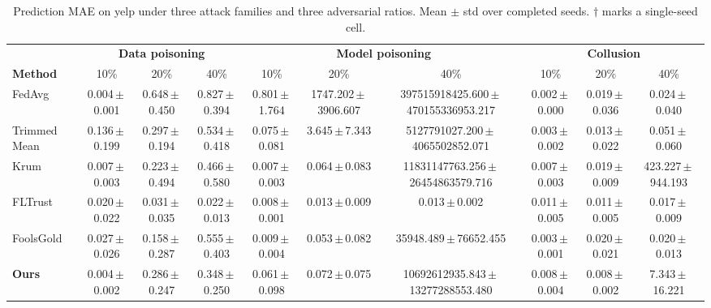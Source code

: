 \begin{table}[t]
\centering
\scriptsize
\caption{Prediction MAE on yelp under three attack families and three adversarial ratios. Mean $\pm$ std over completed seeds. $\dagger$ marks a single-seed cell.}
\label{tab:main_results}
\begin{tabular}{lccccccccc}
\toprule
& \multicolumn{3}{c}{\textbf{Data poisoning}}& \multicolumn{3}{c}{\textbf{Model poisoning}}& \multicolumn{3}{c}{\textbf{Collusion}} \\
\cmidrule(lr){2-4}\cmidrule(lr){5-7}\cmidrule(lr){8-10}
\textbf{Method} & 10\% & 20\% & 40\% & 10\% & 20\% & 40\% & 10\% & 20\% & 40\% \\
\midrule
FedAvg & 0.004\,$\pm$\,0.001 & 0.648\,$\pm$\,0.450 & 0.827\,$\pm$\,0.394 & 0.801\,$\pm$\,1.764 & 1747.202\,$\pm$\,3906.607 & 397515918425.600\,$\pm$\,470155336953.217 & 0.002\,$\pm$\,0.000 & 0.019\,$\pm$\,0.036 & 0.024\,$\pm$\,0.040 \\
Trimmed Mean & 0.136\,$\pm$\,0.199 & 0.297\,$\pm$\,0.194 & 0.534\,$\pm$\,0.418 & 0.075\,$\pm$\,0.081 & 3.645\,$\pm$\,7.343 & 5127791027.200\,$\pm$\,4065502852.071 & 0.003\,$\pm$\,0.002 & 0.013\,$\pm$\,0.022 & 0.051\,$\pm$\,0.060 \\
Krum & 0.007\,$\pm$\,0.003 & 0.223\,$\pm$\,0.494 & 0.466\,$\pm$\,0.580 & 0.007\,$\pm$\,0.003 & 0.064\,$\pm$\,0.083 & 11831147763.256\,$\pm$\,26454863579.716 & 0.007\,$\pm$\,0.003 & 0.019\,$\pm$\,0.009 & 423.227\,$\pm$\,944.193 \\
FLTrust & 0.020\,$\pm$\,0.022 & 0.031\,$\pm$\,0.035 & 0.022\,$\pm$\,0.013 & 0.008\,$\pm$\,0.001 & 0.013\,$\pm$\,0.009 & 0.013\,$\pm$\,0.002 & 0.011\,$\pm$\,0.005 & 0.011\,$\pm$\,0.005 & 0.017\,$\pm$\,0.009 \\
FoolsGold & 0.027\,$\pm$\,0.026 & 0.158\,$\pm$\,0.287 & 0.555\,$\pm$\,0.403 & 0.009\,$\pm$\,0.004 & 0.053\,$\pm$\,0.082 & 35948.489\,$\pm$\,76652.455 & 0.003\,$\pm$\,0.001 & 0.020\,$\pm$\,0.021 & 0.020\,$\pm$\,0.013 \\
\textbf{Ours} & 0.004\,$\pm$\,0.002 & 0.286\,$\pm$\,0.247 & 0.348\,$\pm$\,0.250 & 0.061\,$\pm$\,0.098 & 0.072\,$\pm$\,0.075 & 10692612935.843\,$\pm$\,13277288553.480 & 0.008\,$\pm$\,0.004 & 0.008\,$\pm$\,0.002 & 7.343\,$\pm$\,16.221 \\
\bottomrule
\end{tabular}
\end{table}

